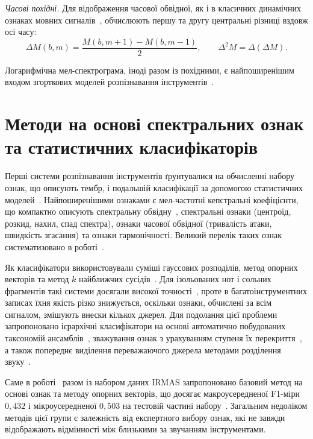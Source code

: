 \textit{Часові похідні.} Для відображення часової обвідної, як і в
класичних динамічних ознаках мовних сигналів~\cite{furui1986},
обчислюють першу та другу центральні різниці вздовж осі часу:
\begin{equation}
    \Delta M(b,m) = \frac{M(b,m+1) - M(b,m-1)}{2}, \qquad
    \Delta^2 M = \Delta(\Delta M).
\end{equation}

Логарифмічна мел-спектрограма, іноді разом із похідними, є найпоширенішим
входом згорткових моделей розпізнавання
інструментів~\cite{han2017,pons2017}.

\section{Методи на основі спектральних ознак та статистичних класифікаторів}
\label{sec:classical}

Перші системи розпізнавання інструментів ґрунтувалися на обчисленні
набору ознак, що описують тембр, і подальшій класифікації за допомогою
статистичних моделей~\cite{herrera2003}. Найпоширенішими ознаками є
мел-частотні кепстральні коефіцієнти, що компактно описують спектральну
обвідну~\cite{davis1980}, спектральні ознаки (центроїд, розкид, нахил,
спад спектра), ознаки часової обвідної (тривалість атаки, швидкість
згасання) та ознаки гармонічності. Великий перелік таких ознак
систематизовано в роботі~\cite{peeters2004}.

Як класифікатори використовували суміші гауссових розподілів, метод
опорних векторів та метод $k$ найближчих сусідів~\cite{marques1999,
agostini2003}. Для ізольованих нот і сольних фрагментів такі системи
досягали високої точності~\cite{eronen2000}, проте в багатоінструментних
записах їхня якість різко знижується, оскільки ознаки, обчислені за всім
сигналом, змішують внески кількох джерел. Для подолання цієї проблеми
запропоновано ієрархічні класифікатори на основі автоматично побудованих
таксономій ансамблів~\cite{essid2006}, зважування ознак з урахуванням
ступеня їх перекриття~\cite{kitahara2007}, а також попереднє виділення
переважаючого джерела методами розділення звуку~\cite{irmas2012}.

Саме в роботі~\cite{irmas2012} разом із набором даних IRMAS запропоновано
базовий метод на основі ознак та методу опорних векторів, що досягає
макроусередненої F1-міри $0{,}432$ і мікроусередненої $0{,}503$ на
тестовій частині набору~\cite{pons2017}. Загальним недоліком методів цієї
групи є залежність від експертного вибору ознак, які не завжди
відображають відмінності між близькими за звучанням інструментами.

